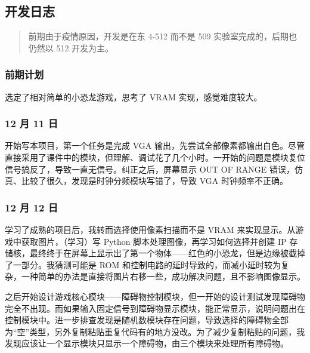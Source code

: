 \documentclass[hyperref,UTF8,12pt,a4paper]{ctexart}
\begin{document}
\hypertarget{ux5f00ux53d1ux65e5ux5fd7}{%
\subsection{开发日志}\label{ux5f00ux53d1ux65e5ux5fd7}}

\begin{quote}
前期由于疫情原因，开发是在东 4-512 而不是 509 实验室完成的，后期也仍然以
512 开发为主。
\end{quote}

\hypertarget{ux524dux671fux8ba1ux5212}{%
\subsubsection{前期计划}\label{ux524dux671fux8ba1ux5212}}

选定了相对简单的小恐龙游戏，思考了 VRAM 实现，感觉难度较大。

\hypertarget{ux6708-11-ux65e5}{%
\subsubsection{12 月 11 日}\label{ux6708-11-ux65e5}}

开始写本项目，第一个任务是完成 VGA
输出，先尝试全部像素都输出白色。尽管直接采用了课件中的模块，但理解、调试花了几个小时。一开始的问题是模块复位信号搞反了，导致一直无信号。纠正之后，屏幕显示
OUT OF RANGE 错误，仿真、比较了很久，发现是时钟分频模块写错了，导致 VGA
时钟频率不正确。

\hypertarget{ux6708-12-ux65e5}{%
\subsubsection{12 月 12 日}\label{ux6708-12-ux65e5}}

学习了成熟的项目后，我转而选择使用像素扫描而不是 VRAM
来实现显示。从游戏中获取图片，（学习）写 Python
脚本处理图像，再学习如何选择并创建 IP
存储核，最终终于在屏幕上显示出了第一个物体------红色的小恐龙，但是边缘被截掉了一部分。我猜测可能是
ROM
和控制电路的延时导致的，而减小延时较为复杂，一种简单的办法是直接将图片右移一些，成功解决问题，且不影响图像显示。

之后开始设计游戏核心模块------障碍物控制模块，但一开始的设计测试发现障碍物完全不出现。而如果输入固定信号到障碍物显示模块，能正常显示，说明问题出在控制模块中。进一步排查发现是随机数模块存在问题，导致选择的障碍物全部为``空''类型，另外复制粘贴重复代码有的地方没改。为了减少复制粘贴的问题，我发现应该让一个显示模块只显示一个障碍物，由三个模块来处理所有障碍物。
\end{document}
